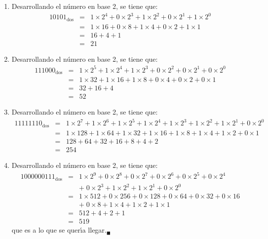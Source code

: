\begin{solucion}
 $\phantom{0}$
 \begin{enumerate}
  \item Desarrollando el n\'umero en base 2, se tiene que:
  \begin{eqnarray*}
   10101_{\text{dos}} 
   & = & 1 \times 2^{4} + 0 \times 2^{3} + 1 \times 2^{2} + 0\times 2^{1} + 1\times 2^{0} \\
   & = & 1\times 16 + 0\times 8 + 1\times 4 + 0 \times 2 + 1\times 1 \\
   & = & 16 + 4 + 1 \\
   & = & 21
  \end{eqnarray*}

  \item Desarrollando el n\'umero en base 2, se tiene que:
  \begin{eqnarray*}
   111000_{\text{dos}} 
   & = & 1\times 2^{5} + 1 \times 2^{4} + 1 \times 2^{3} + 0 \times 2^{2} + 0\times 2^{1} + 0 \times 2^{0} \\
   & = & 1\times 32 + 1\times 16 + 1\times 8 + 0 \times 4  + 0 \times 2 + 0\times 1 \\
   & = & 32 + 16 + 4 \\
   & = & 52
  \end{eqnarray*}

  \item Desarrollando el n\'umero en base 2, se tiene que:
  \begin{eqnarray*}
   11111110_{\text{dos}} 
   & = & 1\times 2^{7} + 1 \times 2^{6} + 1\times 2^{5} + 1 \times 2^{4} + 1 \times 2^{3} + 1 \times 2^{2} + 1 \times 2^{1} + 0 \times 2^{0} \\
   & = & 1 \times 128 + 1 \times 64 + 1\times 32 + 1\times 16 + 1\times 8 + 1 \times 4  + 1 \times 2 + 0\times 1 \\
   & = & 128 + 64 + 32 + 16 + 8 + 4 + 2 \\
   & = & 254
  \end{eqnarray*}

  \item Desarrollando el n\'umero en base 2, se tiene que:
  \begin{eqnarray*}
   1000000111_{\text{dos}} 
   & = & 1 \times 2^{9} + 0 \times 2^{8} + 0 \times 2^{7} + 0 \times 2^{6} + 0 \times 2^{5} + 0 \times 2^{4} \\ 
   & & + \; 0 \times 2^{3} + 1 \times 2^{2} + 1 \times 2^{1} + 0 \times 2^{0} \\
   & = & 1 \times 512 + 0 \times 256 + 0 \times 128 + 0 \times 64 + 0 \times 32 + 0 \times 16 \\
   & & + \; 0 \times 8 + 1 \times 4  + 1 \times 2 + 1 \times 1 \\
   & = & 512 + 4 + 2 + 1 \\
   & = & 519
  \end{eqnarray*}
  que es a lo que se quer\'{\i}a llegar.${}_{\blacksquare}$
 \end{enumerate}
\end{solucion}
